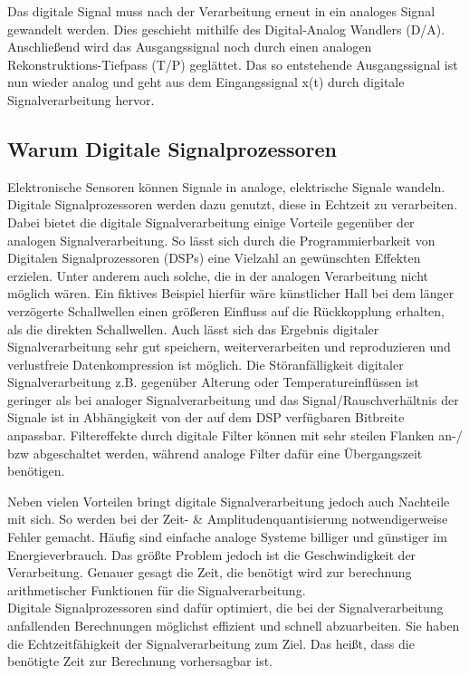 \documentclass[a4paper,12pt,fontsize=12,DIV=12]{scrartcl}
\begin{document}
Das digitale Signal muss nach der Verarbeitung erneut in ein analoges Signal gewandelt werden. Dies geschieht mithilfe des Digital-Analog Wandlers (D/A). Anschließend wird das Ausgangssignal noch durch einen analogen Rekonstruktions-Tiefpass (T/P) geglättet. Das so entstehende Ausgangssignal ist nun wieder analog und geht aus dem Eingangssignal x(t) durch digitale Signalverarbeitung hervor.

\subsection{Warum Digitale Signalprozessoren}
Elektronische Sensoren können Signale in analoge, elektrische Signale wandeln. Digitale Signalprozessoren werden dazu genutzt, diese in Echtzeit zu verarbeiten. Dabei bietet die digitale Signalverarbeitung einige Vorteile gegenüber der analogen Signalverarbeitung.
So lässt sich durch die Programmierbarkeit von Digitalen Signalprozessoren (DSPs) eine Vielzahl an gewünschten Effekten erzielen. Unter anderem auch solche, die in der analogen Verarbeitung nicht möglich wären.  Ein fiktives Beispiel hierfür wäre künstlicher Hall bei dem länger verzögerte Schallwellen einen größeren Einfluss auf die Rückkopplung erhalten, als die direkten Schallwellen.  Auch lässt sich das Ergebnis digitaler Signalverarbeitung sehr gut speichern, weiterverarbeiten und reproduzieren und verlustfreie Datenkompression ist möglich.
Die Störanfälligkeit digitaler Signalverarbeitung z.B. gegenüber Alterung oder Temperatureinflüssen ist geringer als bei analoger Signalverarbeitung und das Signal/Rauschverhältnis der Signale ist in Abhängigkeit von der auf dem DSP verfügbaren Bitbreite anpassbar.
Filtereffekte durch digitale Filter können mit sehr steilen Flanken an-/ bzw abgeschaltet werden, während analoge Filter dafür eine Übergangszeit benötigen.

Neben vielen Vorteilen bringt digitale Signalverarbeitung jedoch auch Nachteile mit sich. So werden bei der Zeit- \& Amplitudenquantisierung notwendigerweise Fehler gemacht. Häufig sind einfache analoge Systeme billiger und günstiger im Energieverbrauch.
Das größte Problem jedoch ist die Geschwindigkeit der Verarbeitung. Genauer gesagt die Zeit, die benötigt wird zur berechnung arithmetischer Funktionen für die Signalverarbeitung.
\\

Digitale Signalprozessoren sind dafür optimiert, die bei der Signalverarbeitung anfallenden Berechnungen möglichst effizient und schnell abzuarbeiten. Sie haben die Echtzeitfähigkeit der Signalverarbeitung zum Ziel. Das heißt, dass die benötigte Zeit zur Berechnung vorhersagbar ist. 
\end{document}
